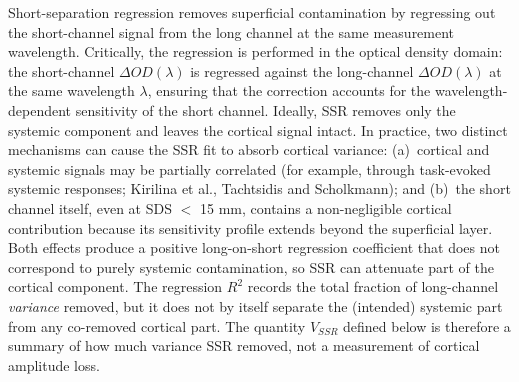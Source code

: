 \documentclass[11pt]{article}
\def\mathrm#1{#1}%
\def\,{ }%
\begin{document}
Short-separation regression removes superficial contamination by regressing out the short-channel signal from the long channel at the same measurement wavelength. Critically, the regression is performed in the optical density domain: the short-channel $\Delta\mathrm{OD}(\lambda)$ is regressed against the long-channel $\Delta\mathrm{OD}(\lambda)$ at the same wavelength $\lambda$, ensuring that the correction accounts for the wavelength-dependent sensitivity of the short channel. Ideally, SSR removes only the systemic component and leaves the cortical signal intact. In practice, two distinct mechanisms can cause the SSR fit to absorb cortical variance: (a)~cortical and systemic signals may be partially correlated (for example, through task-evoked systemic responses; Kirilina et al.\cite{r17}, Tachtsidis and Scholkmann\cite{r8}); and (b)~the short channel itself, even at SDS\,$<$\,15\,mm, contains a non-negligible cortical contribution because its sensitivity profile extends beyond the superficial layer\cite{r15,r19}. Both effects produce a positive long-on-short regression coefficient that does not correspond to purely systemic contamination, so SSR can attenuate part of the cortical component. The regression $R^2$ records the total fraction of long-channel \emph{variance} removed, but it does not by itself separate the (intended) systemic part from any co-removed cortical part. The quantity $V_{\mathrm{SSR}}$ defined below is therefore a summary of how much variance SSR removed, not a measurement of cortical amplitude loss.
\end{document}
